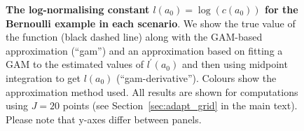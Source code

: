 \documentclass[a4paper, notitlepage, 11pt]{article}
\begin{document}
\begin{figure}[!ht]
\begin{center}
\hfill
\end{center}
\caption{\textbf{The log-normalising constant $l(a_0) = \log(c(a_0))$ for the Bernoulli example in each scenario}.
We show the true value of the function (black dashed line) along with the GAM-based approximation (``gam'') and an approximation based on fitting a GAM to the estimated values of $l^\prime(a_0)$ and then using midpoint integration to get $l(a_0)$ (``gam-derivative'').
Colours show the approximation method used.
All results are shown for computations using $J = 20$ points (see Section~\ref{sec:adapt_grid} in the main text).
Please note that y-axes differ between panels.
}
\label{sfig:ca0_Bernoulli}
\end{figure}

\begin{figure}[!ht]
\begin{center}
 \hfill
{}
\hfill
{}\\
\hfill
{}

\end{center}
\end{figure}
\end{document}

